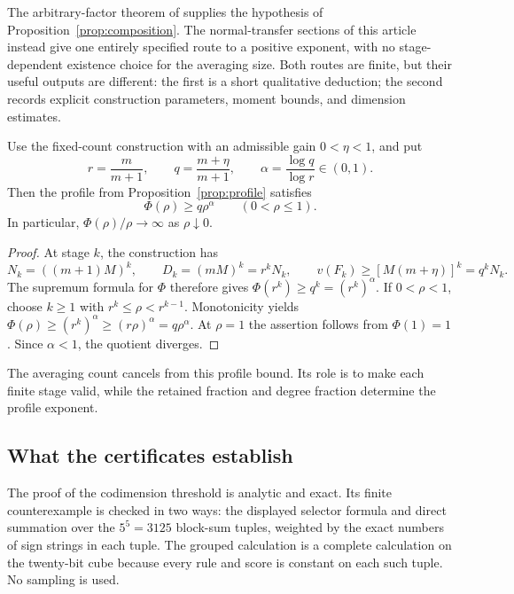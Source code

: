 The arbitrary-factor theorem of \cite{OpenAI2026} supplies the
hypothesis of Proposition~\ref{prop:composition}. The normal-transfer
sections of this article instead give one entirely specified route
to a positive exponent, with no stage-dependent existence choice for
the averaging size. Both routes are finite, but their useful outputs
are different: the first is a short qualitative deduction; the second
records explicit construction parameters, moment bounds, and dimension
estimates.

\begin{corollary}
\label{cor:profile-power}
Use the fixed-count construction with an admissible gain
\(0<\eta<1\), and put
\[
 r=\frac m{m+1},\qquad q=\frac{m+\eta}{m+1},\qquad
 \alpha=\frac{\log q}{\log r}\in(0,1).
\]
Then the profile from Proposition~\ref{prop:profile} satisfies
\[
 \Phi(\rho)\ge q\rho^\alpha\qquad(0<\rho\le1).
\]
In particular, \(\Phi(\rho)/\rho\to\infty\) as \(\rho\downarrow0\).
\end{corollary}

\begin{proof}
At stage \(k\), the construction has
\[
 N_k=((m+1)M)^k,\qquad
 D_k=(mM)^k=r^kN_k,\qquad
 v(F_k)\ge[M(m+\eta)]^k=q^kN_k.
\]
The supremum formula for \(\Phi\) therefore gives
\(\Phi(r^k)\ge q^k=(r^k)^\alpha\).
If \(0<\rho<1\), choose \(k\ge1\) with
\(r^k\le\rho<r^{k-1}\).
Monotonicity yields
\(\Phi(\rho)\ge(r^k)^\alpha\ge(r\rho)^\alpha
=q\rho^\alpha\). At \(\rho=1\) the assertion follows from
\(\Phi(1)=1\). Since \(\alpha<1\), the quotient diverges.
\end{proof}

The averaging count cancels from this profile bound. Its role is to
make each finite stage valid, while the retained fraction and degree
fraction determine the profile exponent.

\subsection{What the certificates establish}

The proof of the codimension threshold is analytic and exact. Its
finite counterexample is checked in two ways: the displayed selector
formula and direct summation over the \(5^5=3125\) block-sum tuples,
weighted by the exact numbers of sign strings in each tuple.
The grouped calculation is a complete calculation on the twenty-bit
cube because every rule and score is constant on each such tuple.
No sampling is used.

